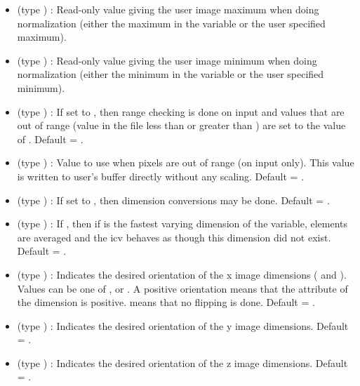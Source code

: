 \begin{itemize}
\item {} (type ) : Read-only value
giving the user image maximum when doing normalization (either the
maximum in the variable or the user specified maximum).

\item {} (type ) : Read-only value
giving the user image minimum when doing normalization (either the
minimum in the variable or the user specified minimum).

\item {} (type ) : If set to 
, then range checking is done on input and values that
are out of range (value in the file less than  or
greater than ) are set to the value of
.  Default = .

\item {} (type ) : Value to
use when pixels are out of range (on input only). This value is
written to user's buffer directly without any scaling. 
Default = .

\item {} (type ) : If set to 
, then dimension conversions may be done. Default =
.

\item {} (type ) : If ,
then if  is the fastest varying dimension of
the variable, elements are averaged and the icv behaves as though this
dimension did not exist. Default = .

\item {} (type ) : Indicates the
desired orientation of the x image dimensions ( and
). Values can be one of ,
 or . A positive
orientation means that the  attribute of the dimension is
positive.  means that no flipping is done.
Default = .

\item {} (type ) : Indicates the
desired orientation of the y image dimensions. Default =
. 

\item {} (type ) : Indicates the
desired orientation of the z image dimensions. Default =
. 


\end{itemize}
